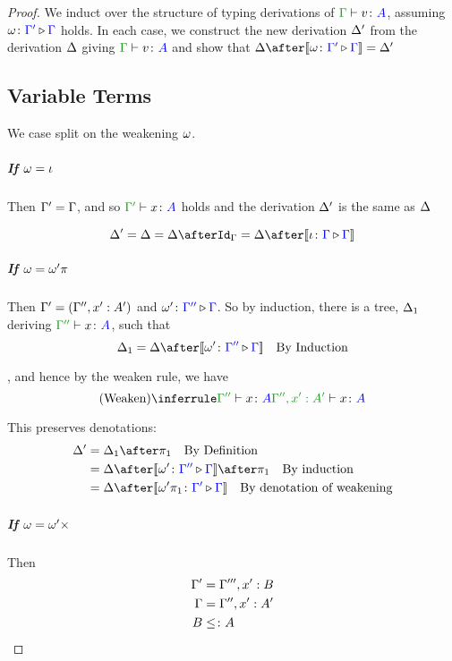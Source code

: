 \documentclass{report}
\begin{document}
\begin{framed}
    
    \begin{proof}
        
        We induct over the structure of typing derivations of $\gtyperelation{v}{A}$, assuming $\omega \colon {\color{blue}\Gamma'} \triangleright {\color {blue} \Gamma}$ holds. In each case, we construct the new derivation $\Delta'$ from the derivation $\Delta$ giving $\gtyperelation{v}{A}$ and show that $\D\after\deno{\wrel{\w}{\G'}{\G}} = \D'$
        
        \subsection{Variable Terms}
            We case split on the weakening $\omega$.
            \subparagraph{If $\omega = \iota$}
            Then $\Gamma' = \Gamma$, and so $\typerelation{\G'}{x}{A}$ holds and the derivation $\Delta'$ is the same as $\Delta$
        
            \begin{equation}
                \D' = \D = \D\after\idg = \D\after\deno{\wrel{\i}{\G}{\G}} 
            \end{equation}
            \subparagraph{If $\omega = \omega'\pi$}
            Then  $\Gamma' = (\Gamma'',x': A')$ and $\omega' \colon {\color{blue}\Gamma''} \triangleright {\color {blue} \Gamma}$. So by induction, there is a tree, $\Delta_1$ deriving $\typerelation{\G''}{x}{A}$,  such that 
            \begin{equation}
                \D_1 = \D\after\deno{\wrel{\w'}{\G''}{\G}} \qt{By Induction}
            \end{equation}
            
            , and hence by the weaken rule, we have 
            \begin{equation}
                \ntreeruleI{Weaken}{\typerelation{\G''}{x}{A}}{\typerelation{\G'', x':A' }{x}{A}}
            \end{equation}
        
            This preserves denotations:
            \begin{align*}
                \D' & = \D_1\after\p\qt{By Definition} \\
                & = \D\after\deno{\wrel{\w'}{\G''}{\G}}\after\p\qt{By induction}\\
                & = \D\after\deno{\wrel{\w'\p}{\G'}{\G}}\qt{By denotation of weakening}
            \end{align*}
        
            \subparagraph{If $\omega = \omega'\times$} 
            Then 
            \begin{align*}
                \Gamma' & = \Gamma''', x': B\\
                \Gamma &= \Gamma'', x': A'\\
                B & \leq\colon A
            \end{align*}
        

\end{proof}
\end{framed}
\end{document}
